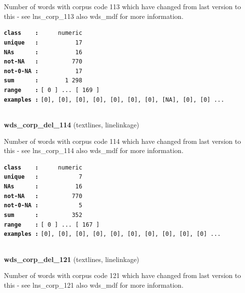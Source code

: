 \documentclass[]{article}
\begin{document}
Number of words with corpus code 113 which have changed from last
version to this - see lns\_corp\_113 also wds\_mdf for more information.

\textbf{\texttt{class\ \ \ \ :}} \texttt{~~~~~numeric}\\
\textbf{\texttt{unique\ \ \ :}} \texttt{~~~~~~~~~~17}\\
\textbf{\texttt{NAs\ \ \ \ \ \ :}} \texttt{~~~~~~~~~~16}\\
\textbf{\texttt{not-NA\ \ \ :}} \texttt{~~~~~~~~~770}\\
\textbf{\texttt{not-0-NA\ :}} \texttt{~~~~~~~~~~17}\\
\textbf{\texttt{sum\ \ \ \ \ \ :}} \texttt{~~~~~~~1~298}\\
\textbf{\texttt{range\ \ \ \ :}}
\texttt{{[}\ 0\ {]}\ ...\ {[}\ 169\ {]}}\\
\textbf{\texttt{examples\ :}}
\texttt{{[}0{]},\ {[}0{]},\ {[}0{]},\ {[}0{]},\ {[}0{]},\ {[}0{]},\ {[}0{]},\ {[}NA{]},\ {[}0{]},\ {[}0{]}\ ...}\\

~

\textbf{wds\_corp\_del\_114} (textlines, linelinkage)

Number of words with corpus code 114 which have changed from last
version to this - see lns\_corp\_114 also wds\_mdf for more information.

\textbf{\texttt{class\ \ \ \ :}} \texttt{~~~~~numeric}\\
\textbf{\texttt{unique\ \ \ :}} \texttt{~~~~~~~~~~~7}\\
\textbf{\texttt{NAs\ \ \ \ \ \ :}} \texttt{~~~~~~~~~~16}\\
\textbf{\texttt{not-NA\ \ \ :}} \texttt{~~~~~~~~~770}\\
\textbf{\texttt{not-0-NA\ :}} \texttt{~~~~~~~~~~~5}\\
\textbf{\texttt{sum\ \ \ \ \ \ :}} \texttt{~~~~~~~~~352}\\
\textbf{\texttt{range\ \ \ \ :}}
\texttt{{[}\ 0\ {]}\ ...\ {[}\ 167\ {]}}\\
\textbf{\texttt{examples\ :}}
\texttt{{[}0{]},\ {[}0{]},\ {[}0{]},\ {[}0{]},\ {[}0{]},\ {[}0{]},\ {[}0{]},\ {[}0{]},\ {[}0{]},\ {[}0{]}\ ...}\\

~

\textbf{wds\_corp\_del\_121} (textlines, linelinkage)

Number of words with corpus code 121 which have changed from last
version to this - see lns\_corp\_121 also wds\_mdf for more information.
\end{document}
